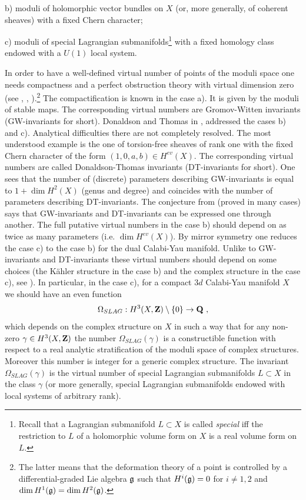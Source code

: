 \documentclass[12pt]{article}
\begin{document}
b) moduli of holomorphic vector bundles on $X$ (or, more generally, of coherent sheaves) with a fixed Chern character;

c) moduli of special Lagrangian submanifolds\footnote{Recall that a Lagrangian submanifold $L\subset X$ is called {\it special} iff the restriction to $L$ of a holomorphic volume form on $X$ is a real volume form on $L$.} with a fixed homology class endowed with a $U(1)$ local system.


In order to have a well-defined virtual number of points of the moduli space one needs compactness and a perfect obstruction theory with virtual dimension zero (see \cite{BF}, \cite{T1}, \cite{T2}).\footnote{ The latter means that the deformation theory of a point is controlled by a differential-graded Lie algebra ${\mathfrak g}$ such that $H^i({\mathfrak g})=0$ for $i\ne 1,2$ and
$\dim H^1({\mathfrak g})=\dim H^2({\mathfrak g})$.}
The compactification is known in the case a). It is given by the moduli of stable maps. The corresponding virtual numbers are Gromov-Witten invariants (GW-invariants for short). Donaldson and Thomas in \cite{DoT},\cite{T2} addressed the cases b) and c). Analytical difficulties there are not completely resolved. The most understood example is the one
of torsion-free sheaves of rank one with the fixed Chern character of the form $(1,0,a,b)\in H^{ev}(X)$.
The corresponding virtual numbers are called Donaldson-Thomas invariants (DT-invariants for short).
One sees that the number of (discrete) parameters describing GW-invariants is equal to $1+\dim H^2(X)$ (genus and degree)
and coincides with the number of parameters describing DT-invariants. The conjecture from \cite{MaNOP} (proved in many cases) says that GW-invariants and DT-invariants  can be expressed one through another. The full putative virtual numbers in the case b) should depend on as twice as many parameters (i.e. $\dim  H^{ev}(X)$). By mirror symmetry one reduces the case c) to the case b) for the dual Calabi-Yau manifold. Unlike to GW-invariants and DT-invariants these virtual numbers should depend on some choices (the K\"ahler structure in the case b) and the complex structure in the case c), see \cite{T2}). In particular, in the case c), for a compact $3d$ Calabi-Yau manifold $X$ we should have an even function $$\Omega_{SLAG}: H^3(X,{\bf Z})\setminus \{0\}\to {\bf Q}\,\,,$$ which depends  on the complex structure on $X$ in such a way that for any non-zero $\gamma \in H^3(X,{\bf Z})$ the number $\Omega_{SLAG}(\gamma)$ is a constructible function
with respect to a real analytic stratification
of the moduli space of complex structures. Moreover this number
is integer for a generic complex structure. The invariant $\Omega_{SLAG}(\gamma)$ is the virtual number of special Lagrangian submanifolds $L\subset X$ in the  class $\gamma$ (or more generally, special Lagrangian submanifolds endowed with  
 local systems of arbitrary rank).
\end{document}
